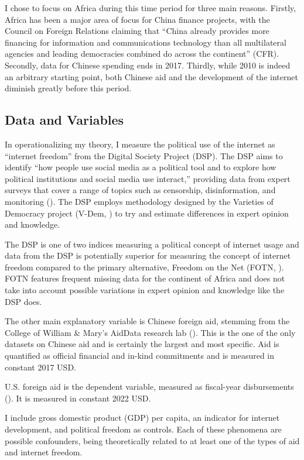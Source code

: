 \documentclass[12pt]{article}
\begin{document}
I chose to focus on Africa during this time period for three main reasons. Firstly, Africa has been a major area of focus for China finance projects, with the Council on Foreign Relations claiming that ``China already provides more financing for information and communications technology than all multilateral agencies and leading democracies combined do across the continent'' (CFR). Secondly, data for Chinese spending ends in 2017. Thirdly, while 2010 is indeed an arbitrary starting point, both Chinese aid and the development of the internet diminish greatly before this period.

\subsection*{Data and Variables}
In operationalizing my theory, I measure the political use of the internet as ``internet freedom'' from the Digital Society Project (DSP). The DSP aims to identify ``how people use social media as a political tool and to explore how political institutions and social media use interact,'' providing data from expert surveys that cover a range of topics such as censorship, disinformation, and monitoring (\cite{mechkova2022}). The DSP employs methodology designed by the Varieties of Democracy project (V-Dem, \cite{coppedge2022}) to try and estimate differences in expert opinion and knowledge.

The DSP is one of two indices measuring a political concept of internet usage and data from the DSP is potentially superior for measuring the concept of internet freedom compared to the primary alternative, Freedom on the Net (FOTN, \cite{house2022}). FOTN features frequent missing data for the continent of Africa and does not take into account possible variations in expert opinion and knowledge like the DSP does.

The other main explanatory variable is Chinese foreign aid, stemming from the College of William \& Mary's AidData research lab (\cite{custer2021}). This is the one of the only datasets on Chinese aid and is certainly the largest and most specific. Aid is quantified as official financial and in-kind commitments and is measured in constant 2017 USD.

U.S. foreign aid is the dependent variable, measured as fiscal-year disbursements (\cite{government2022e}). It is measured in constant 2022 USD.

I include gross domestic product (GDP) per capita, an indicator for internet development, and political freedom as controls. Each of these phenomena are possible confounders, being theoretically related to at least one of the types of aid and internet freedom. 
\end{document}
